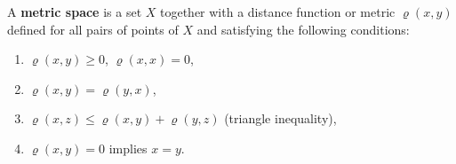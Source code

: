A \textbf{metric space} is a set $X$ together with a distance function or metric $\varrho(x, y)$ defined for all pairs of points of $X$ and satisfying the following conditions:
\begin{enumerate}
\item[(1)] $\varrho(x, y) \geq 0$, $\varrho(x, x) = 0$,
\item[(2)] $\varrho(x, y) = \varrho(y, x)$,
\item[(3)] $\varrho(x, z) \leq \varrho(x, y) + \varrho(y, z)$ (triangle inequality),
\item[(4)] $\varrho(x, y) = 0$ implies $x = y$.
\end{enumerate}
